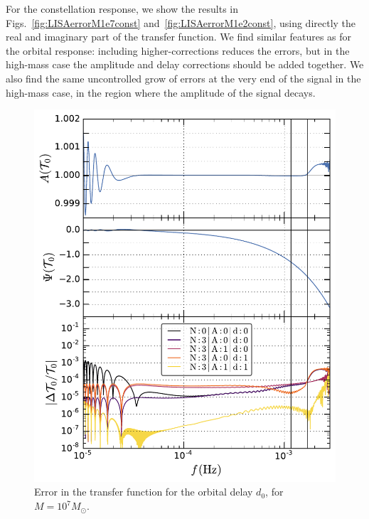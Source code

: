 \documentclass[aps,showpacs,twocolumn,
prd,superscriptaddress,nofootinbib]{revtex4-1}
\newcommand{\Msol}{M_{\odot}}
\begin{document}
For the constellation response, we show the results in Figs.~\ref{fig:LISAerrorM1e7const} and~\ref{fig:LISAerrorM1e2const}, using directly the real and imaginary part of the transfer function. We find similar features as for the orbital response: including higher-corrections reduces the errors, but in the high-mass case the amplitude and delay corrections should be added together. We also find the same uncontrolled grow of errors at the very end of the signal in the high-mass case, in the region where the amplitude of the signal decays.

\begin{figure}
  \centering
  \includegraphics[width=.98\linewidth]{plots/LISAtransfererrorM1e7dO_py.pdf}
  \caption{Error in the transfer function for the orbital delay $d_{0}$, for $M=10^{7} \Msol$.}
  \label{fig:LISAerrorM1e7orb}
\end{figure}
\end{document}
